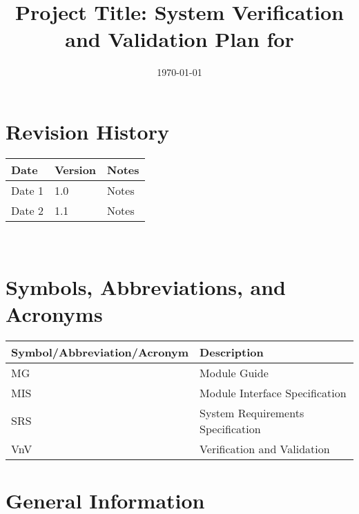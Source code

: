 \documentclass[12pt, titlepage]{article}
\begin{document}
\title{Project Title: System Verification and Validation Plan for \progname{}} 
\author{\authname}
\date{\today}
	
\maketitle


\section*{Revision History}

\begin{tabularx}{\textwidth}{p{3cm}p{2cm}X}
\toprule {\bf Date} & {\bf Version} & {\bf Notes}\\
\midrule
Date 1 & 1.0 & Notes\\
Date 2 & 1.1 & Notes\\
\bottomrule
\end{tabularx}

~\\
\newpage

\tableofcontents

\listoftables


\listoffigures


\newpage

\section{Symbols, Abbreviations, and Acronyms}

\renewcommand{\arraystretch}{1.2}
\begin{tabular}{ll}
\toprule
\textbf{Symbol/Abbreviation/Acronym} & \textbf{Description} \\
\midrule
MG & Module Guide \\
MIS & Module Interface Specification \\
SRS & System Requirements Specification \\
VnV & Verification and Validation \\
\bottomrule
\end{tabular}



\newpage



\section{General Information}
\end{document}
